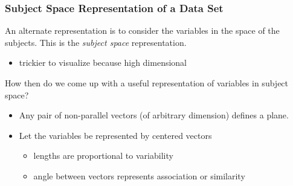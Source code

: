 \documentclass{beamer}
\begin{document}
\begin{frame}
  \frametitle{Subject Space Representation of a Data Set}

\begin{small}

An alternate representation is to consider the variables in the space of the subjects. This is the \emph{subject space} representation. 
\begin{itemize}
\item trickier to visualize because high dimensional
\end{itemize}

How then do we come up with a useful representation of variables in subject space?
\begin{itemize}
 \item Any pair of non-parallel vectors (of arbitrary dimension) defines a plane.  
 \item Let the variables be represented by centered vectors
 \begin{itemize}
    \item lengths are proportional to variability 
 	  \item angle between vectors represents association or similarity 
 \end{itemize}
\end{itemize}
\end{small}

\begin{center}

\end{center}
 

\end{frame}
\end{document}
